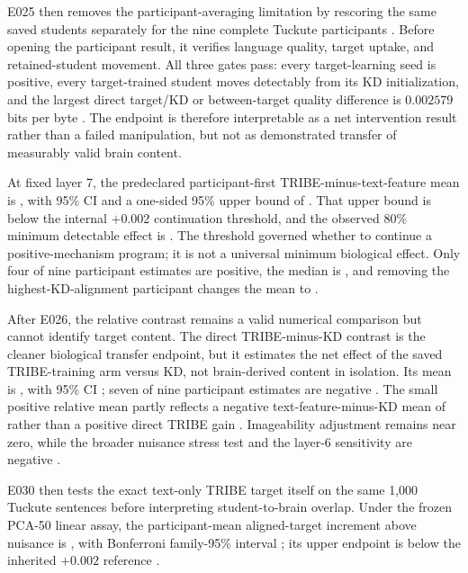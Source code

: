 E025 then removes the participant-averaging limitation by rescoring the same saved students separately for the nine complete Tuckute participants .
Before opening the participant result, it verifies language quality, target uptake, and retained-student movement.
All three gates pass: every target-learning seed is positive, every target-trained student moves detectably from its KD initialization, and the largest direct target/KD or between-target quality difference is $0.002579$ bits per byte .
The endpoint is therefore interpretable as a net intervention result rather than a failed manipulation, but not as demonstrated transfer of measurably valid brain content.

At fixed layer 7, the predeclared participant-first TRIBE-minus-text-feature mean is , with 95\% CI  and a one-sided 95\% upper bound of  .
That upper bound is below the internal $+0.002$ continuation threshold, and the observed 80\% minimum detectable effect is  .
The threshold governed whether to continue a positive-mechanism program; it is not a universal minimum biological effect.
Only four of nine participant estimates are positive, the median is , and removing the highest-KD-alignment participant changes the mean to  .

After E026, the relative contrast remains a valid numerical comparison but cannot identify target content.
The direct TRIBE-minus-KD contrast is the cleaner biological transfer endpoint, but it estimates the net effect of the saved TRIBE-training arm versus KD, not brain-derived content in isolation.
Its mean is , with 95\% CI ; seven of nine participant estimates are negative .
The small positive relative mean partly reflects a negative text-feature-minus-KD mean of  rather than a positive direct TRIBE gain .
Imageability adjustment remains near zero, while the broader nuisance stress test and the layer-6 sensitivity are negative .

E030 then tests the exact text-only TRIBE target itself on the same 1,000 Tuckute sentences before interpreting student-to-brain overlap.
Under the frozen PCA-50 linear assay, the participant-mean aligned-target increment above nuisance is , with Bonferroni family-95\% interval ; its upper endpoint is below the inherited $+0.002$ reference .

